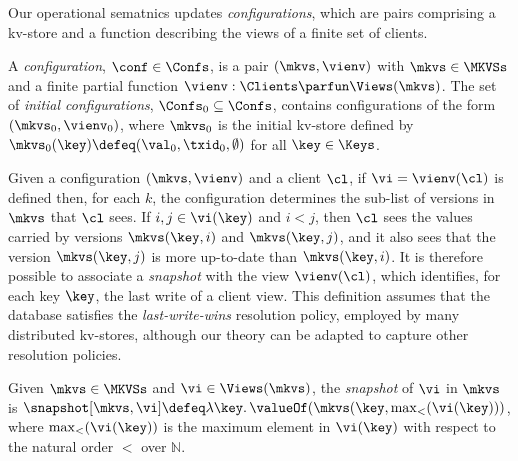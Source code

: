 Our operational sematnics updates {\em configurations},  which are pairs
comprising a kv-store and a function describing the
views of a finite set of clients. 

\begin{definition}
A \emph{configuration}, $\conf \in \Confs $,  is a pair $ (\mkvs, \vienv)$
with $\mkvs \in \MKVSs$ and a finite partial  function
$\vienv : \Clients \parfun \Views(\mkvs)$. 
The set of \emph{initial configurations}, $\Confs_0 \subseteq \Confs$,
contains configurations of the form $ (\mkvs_0, \vienv_0)$, where
$\mkvs_0$ is the { initial kv-store}
defined by
$\mkvs_{0}(\key)\defeq  (\val_0, \txid_0, \emptyset)$ for
all $\key \in \Keys$. 
\end{definition}


Given a configuration $(\mkvs, \vienv)$ and a client $\cl$, 
if $\vi = \vienv(\cl)$ is defined then, for each $k$,  the
configuration determines the sub-list of versions in $\mkvs$ that $\cl$ sees.
If $i,j \in \vi(\key)$ and $i < j$, then $\cl$ sees the values 
carried by versions $\mkvs(\key, i)$ and  $\mkvs(\key, j)$, 
and it also sees that the version 
$\mkvs(\key, j)$ is more 
up-to-date than $\mkvs(\key, i)$. 
It is therefore possible to associate a \emph{snapshot}
with 
the view $\vienv(\cl)$, 
which identifies, for each key $\key$, the last write of a client view. 
This definition assumes that the database satisfies the \emph{last-write-wins}
resolution policy, employed by many distributed kv-stores,  
although our theory can be adapted to capture other resolution policies. 

\begin{definition}[Snapshots]
\label{def:snapshot}
Given $\mkvs \in \MKVSs$ and $\vi \in \Views(\mkvs)$, the \emph{snapshot} of $\vi$ in 
$\mkvs$ is $\snapshot[\mkvs, \vi] \defeq \lambda \key \ldotp \valueOf(\mkvs(\key, \max_{<}(\vi(\key)))$, 
where $\max_{<}(\vi(\key))$ is the maximum element in $\vi(\key)$ with respect to the natural 
order $<$ over $\mathbb{N}$.
\end{definition}

